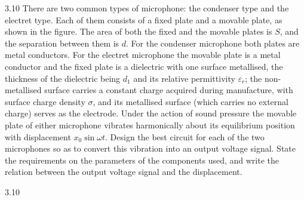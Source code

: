 \begin{problem}{3.10}
There are two common types of microphone: the condenser type and the electret type. Each of them consists of a fixed plate and a movable plate, as shown in the figure. The area of both the fixed and the movable plates is $S$, and the separation between them is $d$. For the condenser microphone both plates are metal conductors. For the electret microphone the movable plate is a metal conductor and the fixed plate is a dielectric with one surface metallised, the thickness of the dielectric being $d_1$ and its relative permittivity $\varepsilon_r$; the non-metallised surface carries a constant charge acquired during manufacture, with surface charge density $\sigma$, and its metallised surface (which carries no external charge) serves as the electrode. Under the action of sound pressure the movable plate of either microphone vibrates harmonically about its equilibrium position with displacement $x_0\sin\omega t$. Design the best circuit for each of the two microphones so as to convert this vibration into an output voltage signal. State the requirements on the parameters of the components used, and write the relation between the output voltage signal and the displacement.
\end{problem}

\begin{figbox}{3.10}
\end{figbox}

